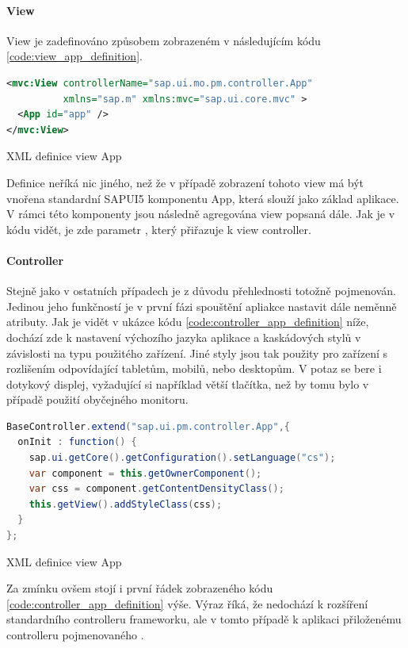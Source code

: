 \documentclass[thesis=M,czech]{FITthesis}[2012/06/26]
\begin{document}
\paragraph{View} View je zadefinováno způsobem zobrazeném v následujícím kódu \ref{code:view_app_definition}.
\begin{algorithm}[H]
	\begin{lstlisting}[language=xml]      
<mvc:View controllerName="sap.ui.mo.pm.controller.App"
          xmlns="sap.m" xmlns:mvc="sap.ui.core.mvc" >
  <App id="app" />
</mvc:View>
	\end{lstlisting}
	\caption{XML definice view App}	
	\label{code:view_app_definition}
\end{algorithm}	
Definice neříká nic jiného, než že v případě zobrazení tohoto view má být vnořena standardní SAPUI5 komponentu App, která slouží jako základ aplikace. V rámci této komponenty jsou následně agregována view popsaná dále. Jak je v kódu vidět, je zde parametr , který přiřazuje k view controller. 
\paragraph{Controller} Stejně jako v ostatních případech je z důvodu přehlednosti totožně pojmenován. Jedinou jeho funkčností je v první fázi spouštění apliakce nastavit dále neměnně atributy. Jak je vidět v ukázce kódu \ref{code:controller_app_definition} níže, dochází zde k nastavení výchozího jazyka aplikace a kaskádových stylů v závislosti na typu použitého zařízení. Jiné styly jsou tak použity pro zařízení s rozlišením odpovídající tabletům, mobilů, nebo desktopům. V potaz se bere i dotykový displej, vyžadující si například větší tlačítka, než by tomu bylo v případě použití obyčejného monitoru.
\begin{algorithm}[H]
	\begin{lstlisting}[language=java]      
BaseController.extend("sap.ui.pm.controller.App",{
  onInit : function() {
    sap.ui.getCore().getConfiguration().setLanguage("cs");
    var component = this.getOwnerComponent();
    var css = component.getContentDensityClass();
    this.getView().addStyleClass(css);
  }
}; 
	\end{lstlisting}
	\caption{XML definice view App}	
	\label{code:controller_app_definition}
\end{algorithm}	
Za zmínku ovšem stojí i první řádek zobrazeného kódu \ref{code:controller_app_definition} výše. Výraz  říká, že nedochází k rozšíření standardního controlleru frameworku, ale v tomto případě k aplikaci přiloženému controlleru pojmenovaného .
\end{document}
